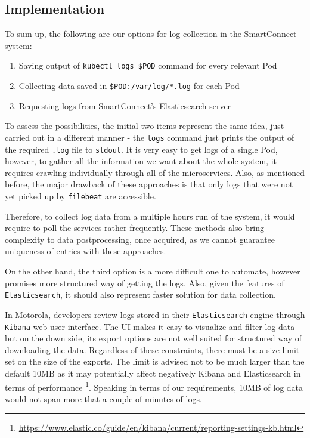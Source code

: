 \subsection{Implementation}

To sum up, the following are our options for log collection in the SmartConnect system:
\begin{enumerate}
    \item Saving output of \texttt{kubectl logs \${POD}} command for every relevant Pod
    \item Collecting data saved in \texttt{\${POD}:/var/log/*.log} for each Pod
    \item Requesting logs from SmartConnect's Elasticsearch server
\end{enumerate}

To assess the possibilities, the initial two items represent the same idea, just carried out in a different manner - the \texttt{logs} command just prints the output of the required \texttt{.log} file to \texttt{stdout}. 
It is very easy to get logs of a single Pod, however, to gather all the information we want about the whole system, it requires crawling individually through all of the microservices. Also, as mentioned before, the major drawback of these approaches is that only logs that were not yet picked up by \texttt{filebeat} are accessible.

Therefore, to collect log data from a multiple hours run of the system, it would require to poll the services rather frequently. These methods also bring complexity to data postprocessing, once acquired, as we cannot guarantee uniqueness of entries with these approaches.

On the other hand, the third option is a more difficult one to automate, however promises more structured way of getting the logs. Also, given the features of \texttt{Elasticsearch}, it should also represent faster solution for data collection.

In Motorola, developers review logs stored in their \texttt{Elasticsearch} engine through \texttt{Kibana} web user interface. The UI makes it easy to visualize and filter log data but on the down side, its export options are not well suited for structured way of downloading the data. Regardless of these constraints, there must be a size limit set on the size of the exports. The limit is advised not to be much larger than the default 10MB as it may potentially affect negatively Kibana and Elasticsearch in terms of performance \footnote{\url{https://www.elastic.co/guide/en/kibana/current/reporting-settings-kb.html}}. Speaking in terms of our requirements, 10MB of log data would not span more that a couple of minutes of logs.

